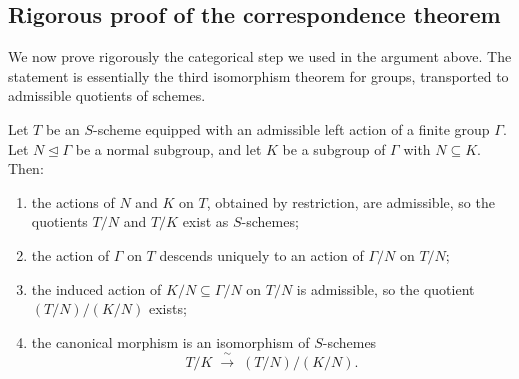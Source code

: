 \subsection*{Rigorous proof of the correspondence theorem}

We now prove rigorously the categorical step we used in the argument above. The statement is essentially the third isomorphism theorem for groups, transported to admissible quotients of schemes.

\begin{prop}\label{prop:correspondence_admissible}
Let $T$ be an $S$-scheme equipped with an admissible left action of a finite group $\Gamma$. Let $N \trianglelefteq \Gamma$ be a normal subgroup, and let $K$ be a subgroup of $\Gamma$ with $N \subseteq K$. Then:
\begin{enumerate}[label=(\alph*)]
    \item the actions of $N$ and $K$ on $T$, obtained by restriction, are admissible, so the quotients $T/N$ and $T/K$ exist as $S$-schemes;
    \item the action of $\Gamma$ on $T$ descends uniquely to an action of $\Gamma/N$ on $T/N$;
    \item the induced action of $K/N \subseteq \Gamma/N$ on $T/N$ is admissible, so the quotient $(T/N)/(K/N)$ exists;
    \item the canonical morphism is an isomorphism of $S$-schemes
    \[
    T/K \;\xrightarrow{\;\sim\;}\; (T/N)/(K/N).
    \]
\end{enumerate}
\end{prop}


